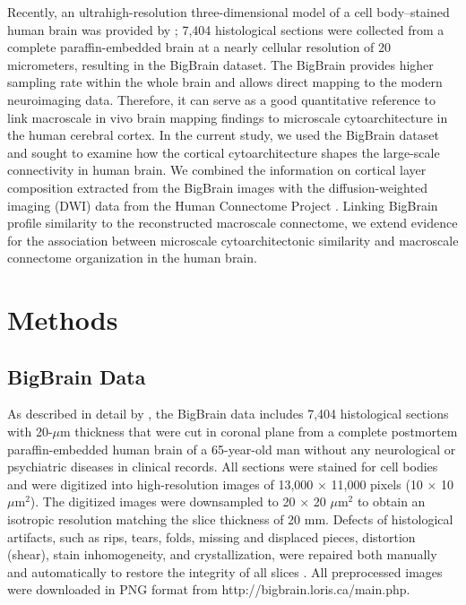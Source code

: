 \begin{refsection}
Recently, an ultrahigh-resolution three-dimensional model of a cell body–stained human brain was provided by \citet{amunts2013bigbrain}; 7,404 histological sections were collected from a complete paraffin-embedded brain at a nearly cellular resolution of 20 micrometers, resulting in the BigBrain dataset. The BigBrain provides higher sampling rate within the whole brain and allows direct mapping to the modern neuroimaging data. Therefore, it can serve as a good quantitative reference to link macroscale in vivo brain mapping findings to microscale cytoarchitecture in the human cerebral cortex. In the current study, we used the BigBrain dataset and sought to examine how the cortical cytoarchitecture shapes the large-scale connectivity in human brain. We combined the information on cortical layer composition extracted from the BigBrain images with the diffusion-weighted imaging (DWI) data from the Human Connectome Project \citep{VANESSEN201362}. Linking BigBrain profile similarity to the reconstructed macroscale connectome, we extend evidence for the association between microscale cytoarchitectonic similarity and macroscale connectome organization in the human brain.

\section*{Methods}
\subsection*{BigBrain Data}
As described in detail by \citet{amunts2013bigbrain}, the BigBrain data includes 7,404 histological sections with 20-$\mu$m thickness that were cut in coronal plane from a complete postmortem paraffin-embedded human brain of a 65-year-old man without any neurological or psychiatric diseases in clinical records. All sections were stained for cell bodies \citep{MERKER1983235} and were digitized into high-resolution images of 13,000 $\times$ 11,000 pixels (10 $\times$ 10 $\mu$m$^{2}$). The digitized images were downsampled to 20 $\times$ 20 $\mu$m$^{2}$ to obtain an isotropic resolution matching the slice thickness of 20 mm. Defects of histological artifacts, such as rips, tears, folds, missing and displaced pieces, distortion (shear), stain inhomogeneity, and crystallization, were repaired both manually and automatically to restore the integrity of all slices \citep{amunts2013bigbrain}. All preprocessed images were downloaded in PNG format from http://bigbrain.loris.ca/main.php.


\end{refsection}
